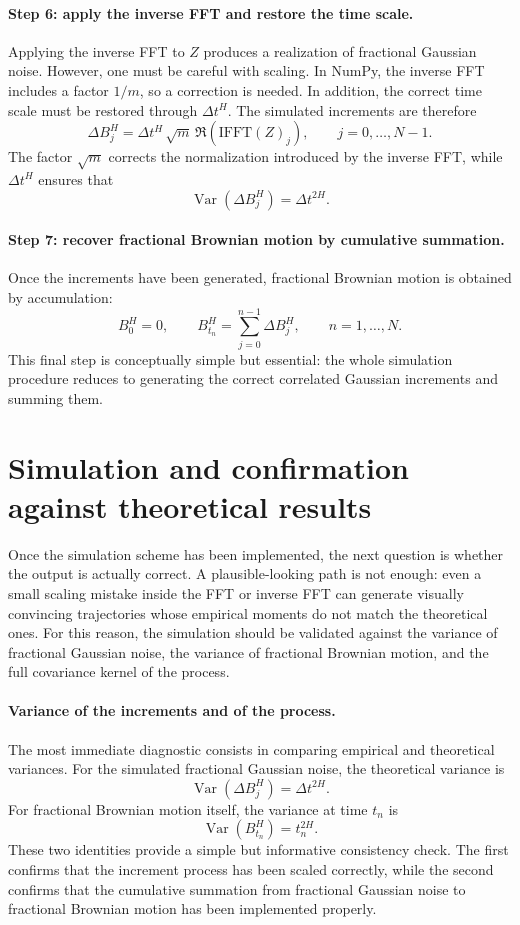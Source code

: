 \documentclass[a4paper,10pt,titlepage,oneside,openany]{book}
\theoremstyle{plain}
\theoremstyle{definition}
\theoremstyle{remark}
\newcommand{\Var}{\operatorname{Var}}
\newcommand{\1}{\mathbf{1}}
\begin{document}
\paragraph{Step 6: apply the inverse FFT and restore the time scale.} Applying the inverse FFT to \(Z\) produces a realization of fractional Gaussian noise. However, one must be careful with scaling. In NumPy, the inverse FFT includes a factor \(1/m\), so a correction is needed. In addition, the correct time scale must be restored through \(\Delta t^H\). The simulated increments are therefore
\[
\Delta B_j^H
=
\Delta t^H\,\sqrt{m}\,
\Re\!\left(\mathrm{IFFT}(Z)_j\right),
\qquad j=0,\dots,N-1.
\]
The factor \(\sqrt{m}\) corrects the normalization introduced by the inverse FFT, while \(\Delta t^H\) ensures that
\[
\Var(\Delta B_j^H)=\Delta t^{2H}.
\]

\paragraph{Step 7: recover fractional Brownian motion by cumulative summation.} Once the increments have been generated, fractional Brownian motion is obtained by accumulation:
\[
B_0^H=0,
\qquad
B_{t_n}^H=\sum_{j=0}^{n-1}\Delta B_j^H,
\qquad n=1,\dots,N.
\]
This final step is conceptually simple but essential: the whole simulation procedure reduces to generating the correct correlated Gaussian increments and summing them.

\section{Simulation and confirmation against theoretical results}

Once the simulation scheme has been implemented, the next question is whether the output is actually correct. A plausible-looking path is not enough: even a small scaling mistake inside the FFT or inverse FFT can generate visually convincing trajectories whose empirical moments do not match the theoretical ones. For this reason, the simulation should be validated against the variance of fractional Gaussian noise, the variance of fractional Brownian motion, and the full covariance kernel of the process.

\paragraph{Variance of the increments and of the process.} The most immediate diagnostic consists in comparing empirical and theoretical variances. For the simulated fractional Gaussian noise, the theoretical variance is
\[
\Var(\Delta B_j^H)=\Delta t^{2H}.
\]
For fractional Brownian motion itself, the variance at time \(t_n\) is
\[
\Var(B_{t_n}^H)=t_n^{2H}.
\]
These two identities provide a simple but informative consistency check. The first confirms that the increment process has been scaled correctly, while the second confirms that the cumulative summation from fractional Gaussian noise to fractional Brownian motion has been implemented properly.
\end{document}
